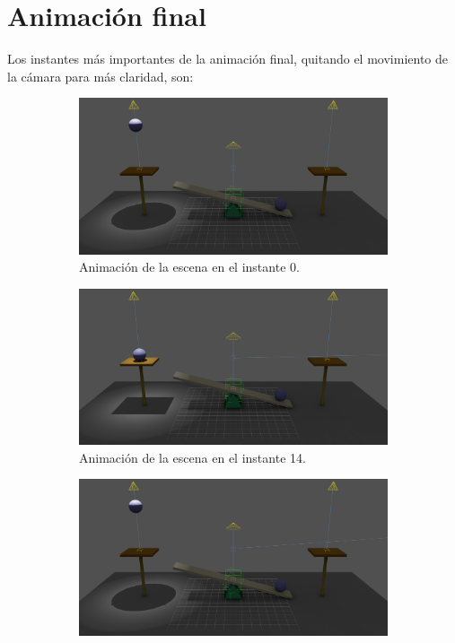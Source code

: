 \documentclass{article}
\begin{document}
\newpage

\section{Animación final}

Los instantes más importantes de la animación final, quitando el movimiento de la cámara para más claridad, son:

\begin{figure}[H]
    \centering 
\begin{subfigure}[t]{0.48\textwidth}
    \centering
    \includegraphics[width=\textwidth]{imagenes/animaciones/general/0.png}
    \caption{Animación de la escena en el instante 0.}
 \end{subfigure}
\hfill
 \begin{subfigure}[t]{0.48\textwidth}
    \centering
    \includegraphics[width=\textwidth]{imagenes/animaciones/general/14.png}
    \caption{Animación de la escena en el instante 14.}
 \end{subfigure}
\hfill
 \begin{subfigure}[t]{0.48\textwidth}
    \centering
    \includegraphics[width=\textwidth]{imagenes/animaciones/general/26.png}

\end{subfigure}
\end{figure}
\end{document}
